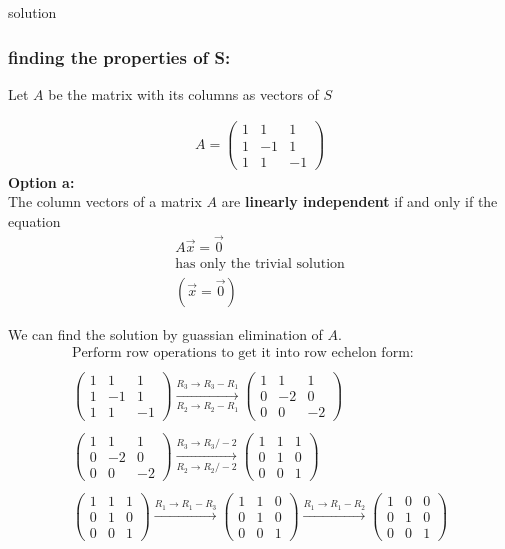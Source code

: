 \documentclass{beamer}
\begin{document}
\begin{frame}{solution}
    \frametitle{finding the properties of S:}
Let $A$ be the matrix with its columns as vectors of $S$

\begin{align}
A = \begin{pmatrix}1 & 1 & 1 \\1 & -1 & 1 \\1 & 1 & -1\end{pmatrix}
\end{align}
\textbf{Option a:}\\
The column vectors of a matrix $A$ are \textbf{linearly independent} if and only if the equation
\begin{align}
A\vec{x} = \vec{0}\\
\text{has only the trivial solution}\\
(\vec{x} = \vec{0})
\end{align}
\end{frame}
\begin{frame}
We can find the solution by guassian elimination of $A$.
\begin{align}
\text{Perform row operations to get it into row echelon form:}\\\\
\begin{pmatrix}1 & 1 & 1 \\1 & -1 & 1 \\1 & 1 & -1\end{pmatrix}\xrightarrow[
R_2 \to R_2 - R_1]{R_3 \to R_3 - R_1}
    \begin{pmatrix} 1 & 1 & 1 \\ 0 & -2 & 0 \\ 0 & 0 & -2 \end{pmatrix}\\\\
\begin{pmatrix} 1 & 1 & 1 \\ 0 & -2 & 0 \\ 0 & 0 & -2 \end{pmatrix}\xrightarrow[
R_2 \to R_2 / -2]{R_3 \to R_3 / -2}
    \begin{pmatrix} 1 & 1 & 1 \\ 0 & 1 & 0 \\ 0 & 0 & 1 \end{pmatrix}\\\\
 \begin{pmatrix} 1 & 1 & 1 \\ 0 & 1 & 0 \\ 0 & 0 & 1 \end{pmatrix}\xrightarrow{
    R_1 \to R_1 - R_3}
    \begin{pmatrix} 1 & 1 & 0 \\ 0 & 1 & 0 \\ 0 & 0 & 1 \end{pmatrix}\xrightarrow{  R_1 \to R_1 - R_2}
    \begin{pmatrix} 1 & 0 & 0 \\ 0 & 1 & 0 \\ 0 & 0 & 1 \end{pmatrix}
    \end{align}
\end{frame}
\end{document}
